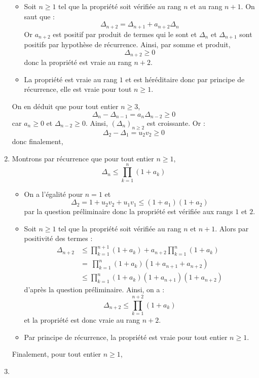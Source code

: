 \documentclass[twoside,french,11pt]{VcCours}
\newcommand{\enc}[1]{\fbox{#1}}
\begin{document}
\begin{enumerate}
\begin{itemize}
\item Soit $n \geq 1$ tel que la propriété soit vérifiée au rang $n$ et au rang $n+1$. On saut que :
$$ \Delta_{n+2}=\Delta_{n+1}+a_{n+2}\Delta_{n}$$
Or $a_{n+2}$ est positif par produit de termes qui le sont et $\Delta_n$ et $\Delta_{n+1}$ sont positifs par hypothèse de récurrence. Ainsi, par somme et produit,
$$ \Delta_{n+2} \geq 0$$
donc la propriété est vraie au rang $n+2$.
\item La propriété est vraie au rang $1$ et est héréditaire donc par principe de récurrence, elle est vraie pour tout $n \geq 1$.
\end{itemize}
On en déduit que pour tout entier $n \geq 3$,
$$\Delta_n - \Delta_{n-1} = a_n \Delta_{n-2} \geq 0$$
car $a_n \geq 0$ et $\Delta_{n-2} \geq 0$. Ainsi, $(\Delta_n)_{n \geq 2}$ est croissante. Or :
$$\Delta_{2}-\Delta_{1}=u_2v_2\geq 0$$
donc finalement,
\enc{$(\Delta_n)_{n \geq 1}$ est croissante}
	
	
	
	\item Montrons par récurrence que pour tout entier $n \geq 1$,
	$$\Delta_n\leq \prod_{k=1}^n(1+a_k)$$
	\begin{itemize}
	\item  On a l'égalité pour $n=1$ et 
	$$\Delta_2= 1+u_2v_2+u_1v_1\leq (1+a_1)(1+a_2)$$
par la question préliminaire donc la propriété est vérifiée aux rangs $1$ et $2$.
\item Soit $n \geq 1$ tel que la propriété soit vérifiée au rang $n$ et $n+1$. Alors par positivité des termes : 
\begin{align*}
 \Delta_{n+2} & \leq   \prod_{k=1}^{n+1}(1+a_k)+a_{n+2}\prod_{k=1}^{n}(1+a_k) \\
 & = \ \prod_{k=1}^{n}(1+a_k)(1+a_{n+1}+a_{n+2}) \\
 & \leq  \prod_{k=1}^{n}(1+a_k)(1+a_{n+1})(1+a_{n+2}) 
 \end{align*}
d'après la question préliminaire. Ainsi, on a :
$$ \Delta_{n+2} \leq \prod_{k=1}^{n+2}(1+a_k)$$
et la propriété est donc vraie au rang $n+2$.
\item Par principe de récurrence, la propriété est vraie pour tout entier $n \geq 1$.
	\end{itemize}
Finalement, pour tout entier $n \geq 1$,
\enc{$\Delta_n\leq \prod_{k=1}^n(1+a_k)$}
\item 
	

\end{enumerate}
\end{document}
